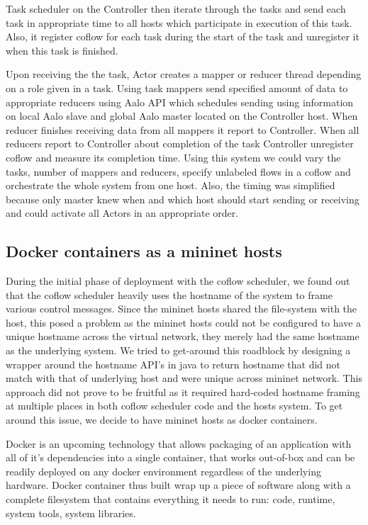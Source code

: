 \documentclass[conference]{IEEEtran}
\begin{document}
Task scheduler on the Controller then iterate through the tasks and send each task in appropriate time to all hosts which participate in execution of this task. Also, it register coflow for each task during the start of the task and unregister it when this task is finished.

Upon receiving the the task, Actor creates a mapper or reducer thread depending on a role given in a task. Using task mappers send specified amount of data to appropriate reducers using Aalo API which schedules sending using information on local Aalo slave and global Aalo master located on the Controller host. When reducer finishes receiving data from all mappers it report to Controller. When all reducers report to Controller about completion of the task Controller unregister coflow and measure its completion time.
Using this system we could vary the tasks, number of mappers and reducers, specify unlabeled flows in a coflow and orchestrate the whole system from one host. Also, the timing was simplified because only master knew when and which host should start sending or receiving and could activate all Actors in an appropriate order. 

\subsection{Docker containers as a mininet hosts}
During the initial phase of deployment with the coflow scheduler, we found out that the coflow scheduler heavily uses the hostname of the system to frame various control messages. Since the mininet hosts shared the file-system with the host, this posed a problem as the mininet hosts could not be configured to have a unique hostname across the virtual network, they merely had the same hostname as the underlying system. We tried to get-around this roadblock by designing a wrapper around the hostname API’s in java to return hostname that did not match with that of underlying host and were unique across mininet network. This approach did not prove to be fruitful as it required hard-coded hostname framing  at multiple places in both coflow scheduler code and the hosts system.  To get around this issue, we decide to have mininet hosts as docker containers.

Docker is an upcoming technology that allows packaging of an application with all of it’s dependencies into a single container, that works out-of-box and can be readily deployed on any docker environment regardless of the underlying hardware. Docker container thus built wrap up a piece of software along with a complete filesystem that contains everything it needs to run: code, runtime, system tools, system libraries. 
\end{document}
